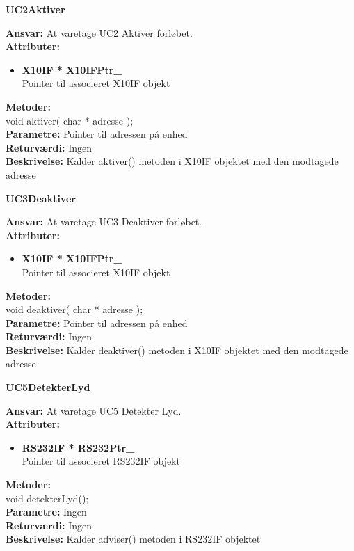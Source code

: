 %
%
{\centering
\textbf{UC2Aktiver}\par
}
\textbf{Ansvar:} At varetage UC2 Aktiver forløbet. \\
\textbf{Attributer:}
\begin{itemize}
	\item \textbf{X10IF * X10IFPtr\_} \\
	Pointer til associeret X10IF objekt
\end{itemize}
\textbf{Metoder:} \\
void aktiver( char * adresse ); \\
\textbf{Parametre:} Pointer til adressen på enhed \\
\textbf{Returværdi:} Ingen \\
\textbf{Beskrivelse:} Kalder aktiver() metoden i X10IF objektet med den modtagede adresse \\

%
%
{\centering
\textbf{UC3Deaktiver}\par
}
\textbf{Ansvar:} At varetage UC3 Deaktiver forløbet. \\
\textbf{Attributer:}
\begin{itemize}
	\item \textbf{X10IF * X10IFPtr\_} \\
	Pointer til associeret X10IF objekt
\end{itemize}
\textbf{Metoder:} \\
void deaktiver( char * adresse ); \\
\textbf{Parametre:} Pointer til adressen på enhed \\
\textbf{Returværdi:} Ingen \\
\textbf{Beskrivelse:} Kalder deaktiver() metoden i X10IF objektet med den modtagede adresse \\

%
%
{\centering
\textbf{UC5DetekterLyd}\par
}
\textbf{Ansvar:} At varetage UC5 Detekter Lyd. \\
\textbf{Attributer:}
\begin{itemize}
	\item \textbf{RS232IF * RS232Ptr\_} \\
	Pointer til associeret RS232IF objekt
\end{itemize}
\textbf{Metoder:} \\
void detekterLyd(); \\
\textbf{Parametre:} Ingen \\
\textbf{Returværdi:} Ingen \\
\textbf{Beskrivelse:} Kalder adviser() metoden i RS232IF objektet \\

